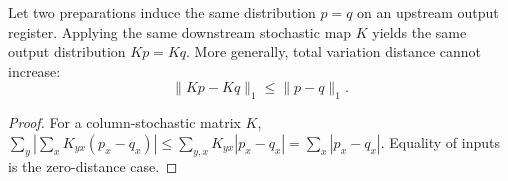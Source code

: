 \setcounter{theorem}{0}
\begin{proposition}
Let two preparations induce the same distribution $p=q$ on an upstream output register. Applying the same downstream stochastic map $K$ yields the same output distribution $Kp=Kq$. More generally, total variation distance cannot increase:
\[
\|Kp-Kq\|_1\leq\|p-q\|_1.
\]
\end{proposition}
\begin{proof}
For a column-stochastic matrix $K$,
$\sum_y|\sum_xK_{yx}(p_x-q_x)|\leq\sum_{y,x}K_{yx}|p_x-q_x|=\sum_x|p_x-q_x|$.
Equality of inputs is the zero-distance case.
\end{proof}

